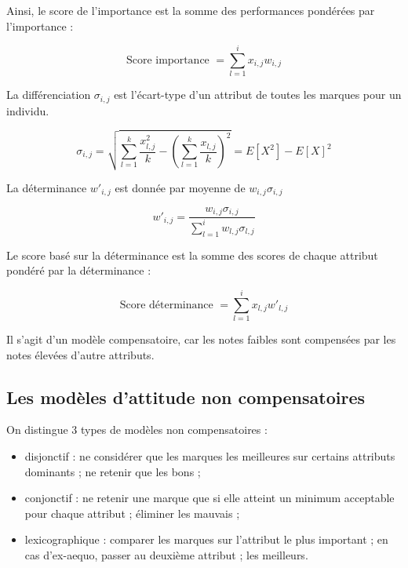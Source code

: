 	
		
	
		
		Ainsi, le score de l'importance est la somme des performances pondérées par l'importance :
		
		$$\text{Score importance } = \sum_{l = 1}^i x_{i, j} w_{i, j}$$
		
		La différenciation $\sigma_{i, j}$ est l'écart-type d'un attribut de toutes les marques pour un individu.
		
		$$\sigma_{i, j} = \sqrt{ \sum_{l = 1}^k \frac{x_{l, j}^2}{k} - (\sum_{l = 1}^k \frac{x_{l, j}}{k} )^2   } = E[X^2] - E[X]^2$$
	
		La déterminance $w'_{i, j}$ est donnée par moyenne de $w_{i, j} \sigma_{i, j}$
		
		$$w'_{i, j} = \frac{w_{i, j} \sigma_{i, j}}{\sum_{l = 1}^i w_{l, j} \sigma_{l, j}}$$
		
		Le score basé sur la déterminance est la somme des scores de chaque attribut pondéré par la déterminance :
		
		$$\text{Score déterminance } = \sum_{l = 1}^i x_{l, j} w'_{l, j}$$
		
		Il s'agit d'un modèle compensatoire, car les notes faibles sont compensées par les notes élevées d'autre attributs.
	
		\subsection{Les modèles d'attitude non compensatoires}
		
		On distingue 3 types de modèles non compensatoires :
	
		\begin{itemize}
			\item disjonctif : ne considérer que les marques les meilleures sur certains attributs dominants ; ne retenir que les bons ;	
			\item conjonctif : ne retenir une marque que si elle atteint un minimum acceptable pour chaque attribut ; éliminer les mauvais ;
			\item lexicographique : comparer les marques sur l'attribut le plus important ; en cas d'ex-aequo, passer au deuxième attribut ; les meilleurs.
		\end{itemize}
	
